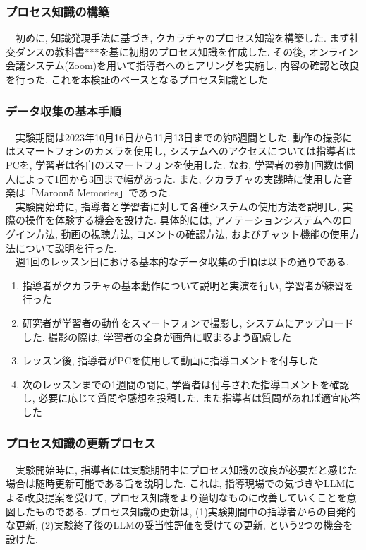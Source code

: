 \subsubsection{プロセス知識の構築}
　初めに, 知識発現手法に基づき, クカラチャのプロセス知識を構築した. まず社交ダンスの教科書{***}を基に初期のプロセス知識を作成した. その後, オンライン会議システム(Zoom)を用いて指導者へのヒアリングを実施し, 内容の確認と改良を行った. これを本検証のベースとなるプロセス知識とした.\\


\subsubsection{データ収集の基本手順}
　実験期間は2023年10月16日から11月13日までの約5週間とした. 動作の撮影にはスマートフォンのカメラを使用し, システムへのアクセスについては指導者はPCを, 学習者は各自のスマートフォンを使用した. なお, 学習者の参加回数は個人によって1回から3回まで幅があった. また, クカラチャの実践時に使用した音楽は「Maroon5 Memories」であった.\\
　実験開始時に, 指導者と学習者に対して各種システムの使用方法を説明し, 実際の操作を体験する機会を設けた. 具体的には, アノテーションシステムへのログイン方法, 動画の視聴方法, コメントの確認方法, およびチャット機能の使用方法について説明を行った.\\
　週1回のレッスン日における基本的なデータ収集の手順は以下の通りである.\\
\begin{enumerate}
    \item 指導者がクカラチャの基本動作について説明と実演を行い, 学習者が練習を行った
    \item 研究者が学習者の動作をスマートフォンで撮影し, システムにアップロードした. 撮影の際は, 学習者の全身が画角に収まるよう配慮した
    \item レッスン後, 指導者がPCを使用して動画に指導コメントを付与した
    \item 次のレッスンまでの1週間の間に, 学習者は付与された指導コメントを確認し, 必要に応じて質問や感想を投稿した. また指導者は質問があれば適宜応答した
\end{enumerate}

\subsubsection{プロセス知識の更新プロセス}
　実験開始時に, 指導者には実験期間中にプロセス知識の改良が必要だと感じた場合は随時更新可能である旨を説明した. これは, 指導現場での気づきやLLMによる改良提案を受けて, プロセス知識をより適切なものに改善していくことを意図したものである. プロセス知識の更新は, (1)実験期間中の指導者からの自発的な更新, (2)実験終了後のLLMの妥当性評価を受けての更新, という2つの機会を設けた.\\

